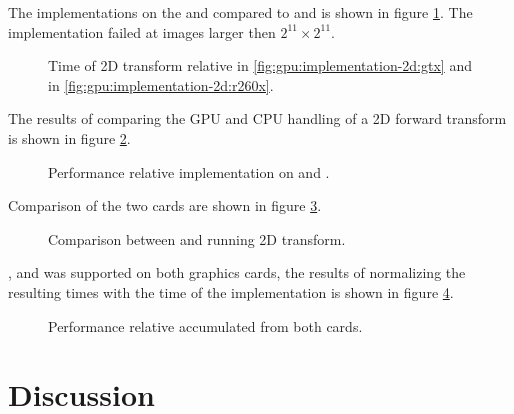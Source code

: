 The implementations on the {\NVCARD} and {\AMDCARD} compared to {\CU} and {\OCL} is shown in figure \ref{fig:gpu:implementation-2d}. The {\GL} implementation failed at images larger then $2^{11}{\times}2^{11}$.

\begin{figure}[!htbp]
	\centering
	\subfloat[\NVCARD\label{fig:gpu:implementation-2d:gtx}]{	
		
	}
	\vfill
	\subfloat[\AMDCARD\label{fig:gpu:implementation-2d:r260x}]{
		
	}	
	\caption{Time of \gls{2D} transform relative {\CU} in \ref{fig:gpu:implementation-2d:gtx} and {\OCL} in \ref{fig:gpu:implementation-2d:r260x}.}
	\label{fig:gpu:implementation-2d}
\end{figure}

The results of comparing the \gls{GPU} and \gls{CPU} handling of a \gls{2D} forward transform is shown in figure \ref{fig:gtx:cpu-2d}.

\begin{figure}[!htbp]
	\centering
	
	\caption{Performance relative {\CU} implementation on {\NVCARD} and {\INTELCPU}.}
	\label{fig:gtx:cpu-2d}
\end{figure}

Comparison of the two cards are shown in figure \ref{fig:gpu-comparison-2d}.

\begin{figure}[!htbp]
	\centering
	
	\caption{Comparison between {\AMDCARD} and {\NVCARD} running \gls{2D} transform.}
	\label{fig:gpu-comparison-2d}
\end{figure}

{\DX}, {\GL} and {\OCL} was supported on both graphics cards, the results of normalizing the resulting times with the time of the {\OCL} implementation is shown in figure \ref{fig:gpu-comparison-tech-2d}.

\begin{figure}[!htbp]
	\centering
	
	\caption{Performance relative {\OCL} accumulated from both cards.}
	\label{fig:gpu-comparison-tech-2d}
\end{figure}

\newpage

\section{Discussion}

